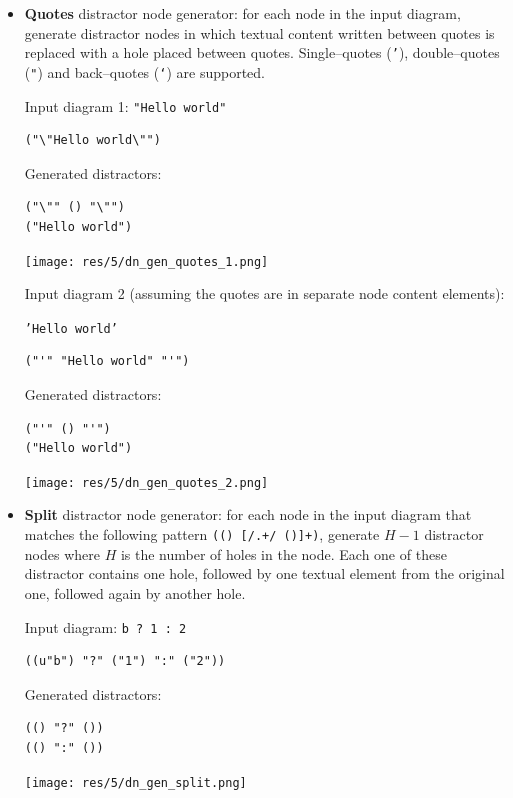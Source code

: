 \begin{chapterBody}
\begin{itemize}
    \item \textbf{Quotes} distractor node generator: for each node in the
input diagram, generate distractor nodes in which textual content written
between quotes is replaced with a hole placed between quotes. Single–quotes
(\texttt{'}), double–quotes (\texttt{"}) and back–quotes (\texttt{`}) are
supported.

\begin{minipage}{.45\linewidth}
Input diagram 1: \texttt{"Hello world"}
\begin{lstlisting}[language=etl]
("\"Hello world\"")
\end{lstlisting}
Generated distractors:
\begin{lstlisting}[language=etl]
("\"" () "\"")
("Hello world")
\end{lstlisting}
\end{minipage}
\hspace{.1\linewidth}
\begin{minipage}{.4\linewidth}
\texttt{[image: res/5/dn\_gen\_quotes\_1.png]}
\end{minipage}


Input diagram 2 (assuming the quotes are in separate node content elements):

\begin{minipage}{.45\linewidth}
\texttt{'Hello world'}
\begin{lstlisting}[language=etl]
("'" "Hello world" "'")
\end{lstlisting}
Generated distractors:
\begin{lstlisting}[language=etl]
("'" () "'")
("Hello world")
\end{lstlisting}
\end{minipage}
\hspace{.1\linewidth}
\begin{minipage}{.4\linewidth}
\texttt{[image: res/5/dn\_gen\_quotes\_2.png]}
\end{minipage}

    \item \textbf{Split} distractor node generator: for each node in the input
diagram that matches the following pattern 
\lstinline[language=etl]{(() [/.+/ ()]+)}, generate $ H - 1 $ distractor nodes
where $ H $ is the number of holes in the node. Each one of these distractor
contains one hole, followed by one textual element from the original one,
followed again by another hole.

\begin{minipage}{.45\linewidth}
Input diagram: \texttt{b ? 1 : 2}
\begin{lstlisting}[language=etl]
((u"b") "?" ("1") ":" ("2"))
\end{lstlisting}
Generated distractors:
\begin{lstlisting}[language=etl]
(() "?" ())
(() ":" ())
\end{lstlisting}
\end{minipage}
\hspace{.1\linewidth}
\begin{minipage}{.4\linewidth}
\texttt{[image: res/5/dn\_gen\_split.png]}
\end{minipage}
\end{itemize}


\end{chapterBody}
